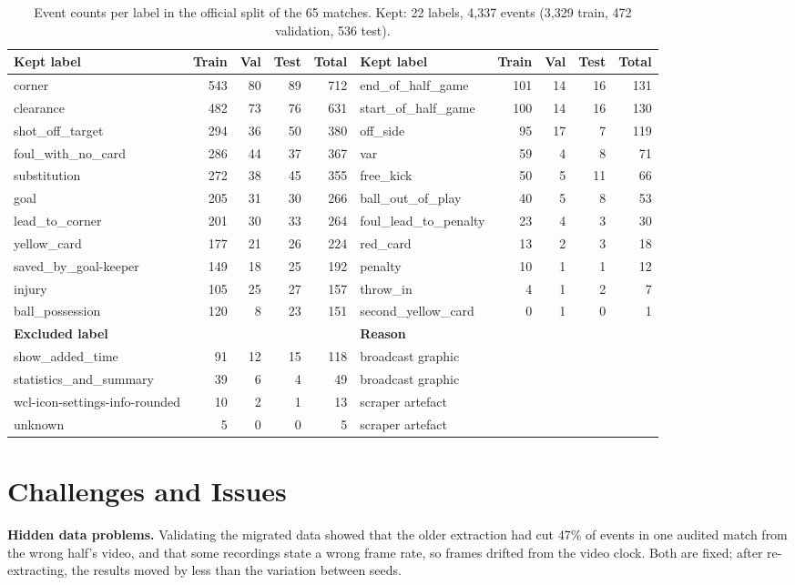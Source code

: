 \documentclass[11pt]{article}
\begin{document}
\begin{table}[h]
\centering\footnotesize
\begin{tabular}{lrrrr@{\hspace{2.5em}}lrrrr}
\toprule
Kept label & Train & Val & Test & Total & Kept label & Train & Val & Test & Total\\
\midrule
corner & 543 & 80 & 89 & 712 & end\_of\_half\_game & 101 & 14 & 16 & 131\\
clearance & 482 & 73 & 76 & 631 & start\_of\_half\_game & 100 & 14 & 16 & 130\\
shot\_off\_target & 294 & 36 & 50 & 380 & off\_side & 95 & 17 & 7 & 119\\
foul\_with\_no\_card & 286 & 44 & 37 & 367 & var & 59 & 4 & 8 & 71\\
substitution & 272 & 38 & 45 & 355 & free\_kick & 50 & 5 & 11 & 66\\
goal & 205 & 31 & 30 & 266 & ball\_out\_of\_play & 40 & 5 & 8 & 53\\
lead\_to\_corner & 201 & 30 & 33 & 264 & foul\_lead\_to\_penalty & 23 & 4 & 3 & 30\\
yellow\_card & 177 & 21 & 26 & 224 & red\_card & 13 & 2 & 3 & 18\\
saved\_by\_goal-keeper & 149 & 18 & 25 & 192 & penalty & 10 & 1 & 1 & 12\\
injury & 105 & 25 & 27 & 157 & throw\_in & 4 & 1 & 2 & 7\\
ball\_possession & 120 & 8 & 23 & 151 & second\_yellow\_card & 0 & 1 & 0 & 1\\
\midrule
\textbf{Excluded label} & & & & & \textbf{Reason} & & & & \\
show\_added\_time & 91 & 12 & 15 & 118 & broadcast graphic & & & & \\
statistics\_and\_summary & 39 & 6 & 4 & 49 & broadcast graphic & & & & \\
wcl-icon-settings-info-rounded & 10 & 2 & 1 & 13 & scraper artefact & & & & \\
unknown & 5 & 0 & 0 & 5 & scraper artefact & & & & \\
\bottomrule
\end{tabular}
\caption{Event counts per label in the official split of the 65 matches. Kept: 22 labels, 4,337 events
(3,329 train, 472 validation, 536 test).}
\label{tab:labels}
\end{table}

\section*{Challenges and Issues}
\textbf{Hidden data problems.} Validating the migrated data showed that the older extraction had cut
47\% of events in one audited match from the wrong half's video, and that some recordings state a wrong
frame rate, so frames drifted from the video clock. Both are fixed; after re-extracting, the results
moved by less than the variation between seeds.
\end{document}
